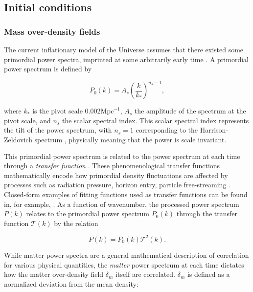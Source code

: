 \documentclass[floats,floatfix,showpacs,amssymb,prd,superscriptaddress,nofootinbib, 11pt]{revtex4-2} %
\begin{document}
\subsection{Initial conditions}
\subsubsection{Mass over-density fields}
The current inflationary model of the Universe assumes that there existed some primordial power spectra, imprinted at some arbitrarily early time \citep{Coles_2001}. A primordial power spectrum is defined by 

\begin{equation}
    P_0 (k) = A_s \left( \frac{k}{k_*} \right)^{n_s - 1},
    \label{eq:primordial_power_spectrum}
\end{equation}

\noindent where $k_*$ is the pivot scale $0.002 \text{Mpc}^{-1}$,
$A_s$ the amplitude of the spectrum at the pivot scale, and $n_s$ the scalar spectral index. This scalar spectral index represents the tilt of the power spectrum, with $n_s = 1$ corresponding to the Harrison-Zeldovich spectrum \citep{Harrison_1970, Zeldovich_1972}, physically meaning that the power is scale invariant.

This primordial power spectrum is related to the power spectrum at each time through a \textit{transfer function} \citep{Bardeen_1986}. These phenomenological transfer functions mathematically encode how primordial density fluctuations are affected by processes such as radiation pressure, horizon entry, particle free-streaming \citep{Coles_2001}. Closed-form examples of fitting functions used as transfer functions can be found in, for example, \citet{Bardeen_1986, Eisenstein_Hu_1998}. As a function of wavenumber, the processed power spectrum $P(k)$ relates to the primordial power spectrum $P_0 (k)$ through the transfer function $\mathcal{T}(k)$ by the relation

\begin{equation}
    P(k) = P_0 (k) \mathcal{T}^2 (k).
    \label{eq:processed_power_spectrum}
\end{equation}

While matter power spectra are a general mathematical description of correlation for various physical quantities, the \textit{matter} power spectrum at each time dictates how the matter over-density field $\delta_m$ itself are correlated. $\delta_m$ is defined as a normalized deviation from the mean density:
\end{document}
